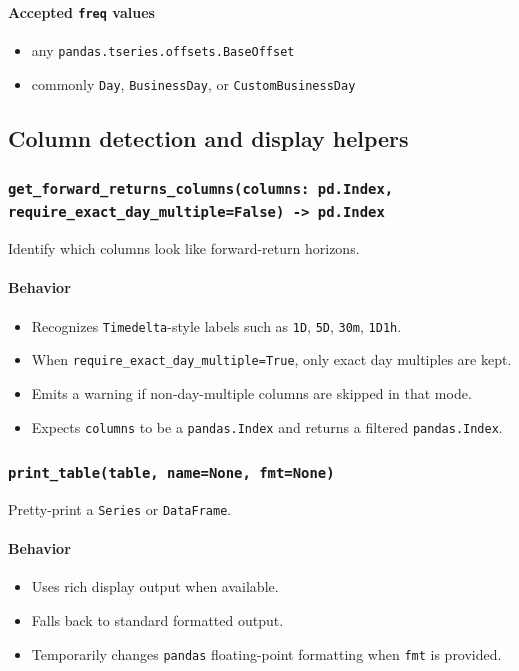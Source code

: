 \documentclass[11pt]{article}
\begin{document}
\paragraph{Accepted \texttt{freq} values}
\begin{itemize}
  \item any \texttt{pandas.tseries.offsets.BaseOffset}
  \item commonly \texttt{Day}, \texttt{BusinessDay}, or \texttt{CustomBusinessDay}
\end{itemize}

\subsection{Column detection and display helpers}

\subsubsection{\texttt{get\_forward\_returns\_columns(columns: pd.Index, require\_exact\_day\_multiple=False) -> pd.Index}}
Identify which columns look like forward-return horizons.

\paragraph{Behavior}
\begin{itemize}
  \item Recognizes \texttt{Timedelta}-style labels such as \texttt{1D}, \texttt{5D}, \texttt{30m}, \texttt{1D1h}.
  \item When \texttt{require\_exact\_day\_multiple=True}, only exact day multiples are kept.
  \item Emits a warning if non-day-multiple columns are skipped in that mode.
  \item Expects \texttt{columns} to be a \texttt{pandas.Index} and returns a filtered \texttt{pandas.Index}.
\end{itemize}

\subsubsection{\texttt{print\_table(table, name=None, fmt=None)}}
Pretty-print a \texttt{Series} or \texttt{DataFrame}.

\paragraph{Behavior}
\begin{itemize}
  \item Uses rich display output when available.
  \item Falls back to standard formatted output.
  \item Temporarily changes \texttt{pandas} floating-point formatting when \texttt{fmt} is provided.
\end{itemize}
\end{document}
